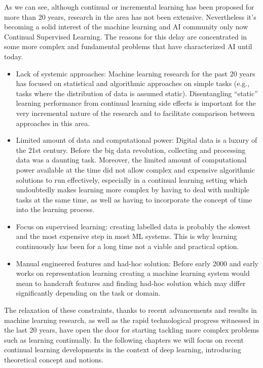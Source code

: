 \documentclass[english, LaM, oneside]{sapthesis}%
\begin{document}
\newline \newline
As we can see, although continual or incremental learning has been proposed for more than 20 years, research in the area has not been extensive. Nevertheless it's becoming a solid interest of the machine learning and AI community only now
Continual Supervised Learning. The reasons for this delay are concentrated in some more complex and fundamental problems that have characterized AI until today.
\begin{itemize}
    \item Lack of systemic approaches: Machine learning research for the past 20 years has focused on statistical and algorithmic approaches on simple tasks (e.g., tasks where the distribution of data is assumed static). Disentangling “static” learning performance from continual learning side effects is important for the very incremental nature of the research and to facilitate comparison between approaches in this area.
    \item Limited amount of data and computational power: Digital data is a luxury of the 21st century. Before the big data revolution, collecting and processing data was a daunting task. Moreover, the limited amount of computational power available at the time did not allow complex and expensive algorithmic solutions to run effectively, especially in a continual learning setting which undoubtedly makes learning more complex by having to deal with multiple tasks at the same time, as well as having to incorporate the concept of time into the learning process.
    \item Focus on supervised learning: creating labelled data is probably the slowest and the most expensive step in most ML systems. This is why learning continuously has been for a long time not a viable and practical option.
    \item Manual engineered features and had-hoc solution: Before early 2000 and early works on representation learning creating a machine learning system would mean to handcraft features and finding had-hoc solution which may differ significantly depending on the task or domain.
\end{itemize}

The relaxation of these constraints, thanks to recent advancements and results in machine learning research, as well as the rapid technological progress witnessed in the last 20 years, have open the door for starting tackling more complex problems such as learning continually.
In the following chapters we will focus on recent continual learning developments in the context of deep learning, introducing theoretical concept and notions.
\end{document}
